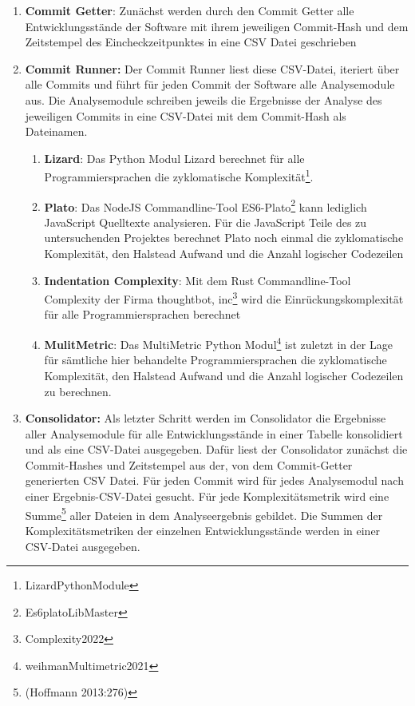 \begin{enumerate}
\def\labelenumi{\arabic{enumi}.}
\item
    \textbf{Commit Getter}: Zunächst werden durch den Commit Getter alle
    Entwicklungsstände der Software mit ihrem jeweiligen Commit-Hash und
    dem Zeitstempel des Eincheckzeitpunktes in eine CSV Datei geschrieben
\item
    \textbf{Commit Runner:} Der Commit Runner liest diese CSV-Datei,
    iteriert über alle Commits und führt für jeden Commit der Software
    alle Analysemodule aus. Die Analysemodule schreiben jeweils die
    Ergebnisse der Analyse des jeweiligen Commits in eine CSV-Datei mit
    dem Commit-Hash als Dateinamen.

    \begin{enumerate}
    \def\labelenumii{\alph{enumii}.}
    \item
    \textbf{Lizard}: Das Python Modul Lizard berechnet für alle
    Programmiersprachen die zyklomatische Komplexität\footnote{LizardPythonModule}.
    \item
    \textbf{Plato}: Das NodeJS Commandline-Tool ES6-Plato\footnote{Es6platoLibMaster}
    kann lediglich JavaScript Quelltexte analysieren. Für die JavaScript
    Teile des zu untersuchenden Projektes berechnet Plato noch einmal
    die zyklomatische Komplexität, den Halstead Aufwand und die Anzahl
    logischer Codezeilen
    \item
    \textbf{Indentation Complexity}: Mit dem Rust Commandline-Tool
    Complexity der Firma thoughtbot, inc\footnote{Complexity2022} wird
    die Einrückungskomplexität für alle Programmiersprachen berechnet
    \item
    \textbf{MulitMetric}: Das MultiMetric Python Modul\footnote{weihmanMultimetric2021}
    ist zuletzt in der Lage für sämtliche hier behandelte
    Programmiersprachen die zyklomatische Komplexität, den Halstead
    Aufwand und die Anzahl logischer Codezeilen zu berechnen.
    \end{enumerate}
\item
    \textbf{Consolidator:} Als letzter Schritt werden im Consolidator die
    Ergebnisse aller Analysemodule für alle Entwicklungsstände in einer
    Tabelle konsolidiert und als eine CSV-Datei ausgegeben. Dafür liest
    der Consolidator zunächst die Commit-Hashes und Zeitstempel aus der,
    von dem Commit-Getter generierten CSV Datei. Für jeden Commit wird für
    jedes Analysemodul nach einer Ergebnis-CSV-Datei gesucht. Für jede
    Komplexitätsmetrik wird eine Summe\footnote{(Hoffmann 2013:276)} aller
    Dateien in dem Analyseergebnis gebildet. Die Summen der
    Komplexitätsmetriken der einzelnen Entwicklungsstände werden in einer
    CSV-Datei ausgegeben.
\end{enumerate}

